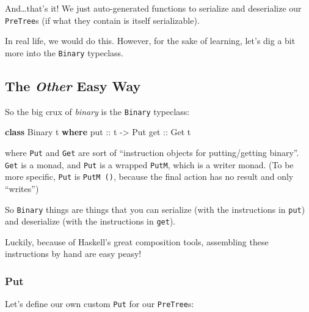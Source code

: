 \documentclass[]{article}
\newenvironment{Shaded}{}{}
\newcommand{\DataTypeTok}[1]{\textcolor[rgb]{0.56,0.13,0.00}{#1}}
\newcommand{\KeywordTok}[1]{\textcolor[rgb]{0.00,0.44,0.13}{\textbf{#1}}}
\newcommand{\NormalTok}[1]{#1}
\newcommand{\OtherTok}[1]{\textcolor[rgb]{0.00,0.44,0.13}{#1}}
\begin{document}
And\ldots that's it! We just auto-generated functions to serialize and
deserialize our \texttt{PreTree}s (if what they contain is itself serializable).

In real life, we would do this. However, for the sake of learning, let's dig a
bit more into the \texttt{Binary} typeclass.

\subsection{\texorpdfstring{The \emph{Other} Easy
Way}{The Other Easy Way}}\label{the-other-easy-way}

So the big crux of \emph{binary} is the \texttt{Binary} typeclass:

\begin{Shaded}
\begin{Highlighting}[]
\KeywordTok{class} \DataTypeTok{Binary}\NormalTok{ t }\KeywordTok{where}
\OtherTok{    put ::}\NormalTok{ t }\OtherTok{{-}\textgreater{}} \DataTypeTok{Put}
\OtherTok{    get ::} \DataTypeTok{Get}\NormalTok{ t}
\end{Highlighting}
\end{Shaded}

where \texttt{Put} and \texttt{Get} are sort of ``instruction objects for
putting/getting binary''. \texttt{Get} is a monad, and \texttt{Put} is a wrapped
\texttt{PutM}, which is a writer monad. (To be more specific, \texttt{Put} is
\texttt{PutM\ ()}, because the final action has no result and only ``writes'')

So \texttt{Binary} things are things that you can serialize (with the
instructions in \texttt{put}) and deserialize (with the instructions in
\texttt{get}).

Luckily, because of Haskell's great composition tools, assembling these
instructions by hand are easy peasy!

\subsubsection{Put}\label{put}

Let's define our own custom \texttt{Put} for our \texttt{PreTree}s:
\end{document}
